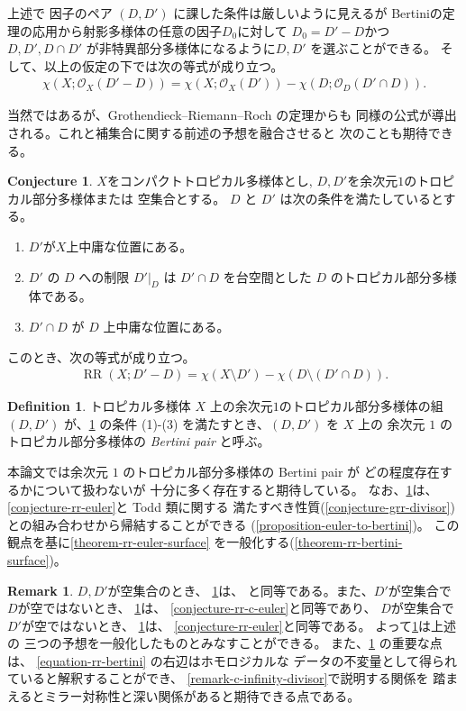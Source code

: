 \documentclass[a4paper,dvipdfmx,reqno,12pt]{amsart}
\theoremstyle{definition}
\newtheorem{definition}[theorem]{Definition}
\newtheorem{conjecture}[theorem]{Conjecture}
\newtheorem{remark}[theorem]{Remark}
\newcommand{\opn}[1]{\operatorname{#1}}
\numberwithin{equation}{section}
\begin{document}
上述で 因子のペア $(D,D')$ に課した条件は厳しいように見えるが
Bertiniの定理の応用から射影多様体の任意の因子$D_0$に対して
$D_0=D'-D$かつ
$D,D',D\cap D'$ が非特異部分多様体になるように$D,D'$
を選ぶことができる。
そして、以上の仮定の下では次の等式が成り立つ。
\begin{align}
\chi(X;\mathcal{O}_X(D'-D))=
\chi(X;\mathcal{O}_X(D'))-
\chi(D;\mathcal{O}_D(D'\cap D)).
\end{align}

当然ではあるが、Grothendieck--Riemann--Roch の定理からも
同様の公式が導出される。これと補集合に関する前述の予想を融合させると
次のことも期待できる。

\begin{conjecture}
\label{conjecture-rr-bertini}
$X$をコンパクトトロピカル多様体とし, 
$D,D'$を余次元$1$のトロピカル部分多様体または
空集合とする。
$D$ と $D'$ は次の条件を満たしているとする。
\begin{enumerate}
\item $D'$が$X$上中庸な位置にある。
\item $D'$ の $D$ への制限 $D'|_{D}$ は 
$D'\cap D$ を台空間とした $D$ のトロピカル部分多様体である。
\item $D'\cap D$ が $D$ 上中庸な位置にある。
\end{enumerate}
このとき、次の等式が成り立つ。
\begin{align}
\label{equation-rr-bertini}
\opn{RR}(X;D'-D)=\chi (X\setminus D')-
\chi(D\setminus (D'\cap D)).
\end{align}

\end{conjecture}

\begin{definition}
トロピカル多様体 $X$ 上の余次元$1$のトロピカル部分多様体の組
$(D,D')$ が、\cref{conjecture-rr-bertini} の条件
(1)-(3) を満たすとき、$(D,D')$ を $X$ 上の
余次元 $1$ のトロピカル部分多様体の
\emph{Bertini pair} と呼ぶ。
\end{definition}

本論文では余次元 $1$ のトロピカル部分多様体の Bertini pair が
どの程度存在するかについて扱わないが
十分に多く存在すると期待している。
なお、\cref{conjecture-rr-bertini}は、
\cref{conjecture-rr-euler}と Todd 類に関する
満たすべき性質(\cref{conjecture-grr-divisor})
との組み合わせから帰結することができる
(\cref{proposition-euler-to-bertini})。
この観点を基に\cref{theorem-rr-euler-surface}
を一般化する(\cref{theorem-rr-bertini-surface})。
\begin{remark}
$D,D'$が空集合のとき、
\cref{conjecture-rr-bertini}は、
\cite[Conjecture 6.13]{demedrano2023chern}
と同等である。また、$D'$が空集合で$D$が空ではないとき、
\cref{conjecture-rr-bertini}は、
\cref{conjecture-rr-c-euler}と同等であり、
$D$が空集合で$D'$が空ではないとき、
\cref{conjecture-rr-bertini}は、
\cref{conjecture-rr-euler}と同等である。
よって\cref{conjecture-rr-bertini}は上述の
三つの予想を一般化したものとみなすことができる。
また、\cref{conjecture-rr-bertini} の重要な点は、
\eqref{equation-rr-bertini} の右辺はホモロジカルな
データの不変量として得られていると解釈することができ、
\cref{remark-c-infinity-divisor}で説明する関係を
踏まえるとミラー対称性と深い関係があると期待できる点である。
\end{remark}
\end{document}

